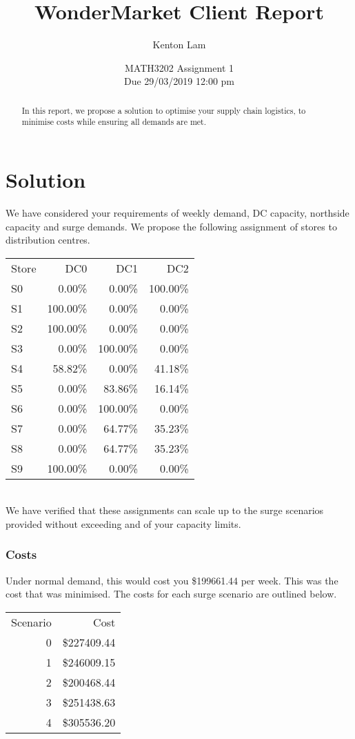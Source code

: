 \documentclass[11pt,a4paper]{article}
\author{Kenton Lam}
\date{{MATH3202 Assignment 1 \\ Due 29/03/2019 12:00 pm}}
\title{WonderMarket Client Report}
\begin{document}
\maketitle
\begin{abstract}
    In this report, we propose a solution to optimise your supply chain logistics, 
    to minimise costs while ensuring all demands are met.
\end{abstract}

\part{Solution}
We have considered your requirements of weekly demand, DC capacity, northside capacity and surge demands.
We propose
the following assignment of stores to distribution centres.\\[0.8em]
\begin{tabular}{l  r  r  r }
    Store & DC0 & DC1 & DC2 \\ 
S0 & 0.00\% & 0.00\% & 100.00\% \\
S1 & 100.00\% & 0.00\% & 0.00\% \\
S2 & 100.00\% & 0.00\% & 0.00\% \\
S3 & 0.00\% & 100.00\% & 0.00\% \\
S4 & 58.82\% & 0.00\% & 41.18\% \\
S5 & 0.00\% & 83.86\% & 16.14\% \\
S6 & 0.00\% & 100.00\% & 0.00\% \\
S7 & 0.00\% & 64.77\% & 35.23\% \\
S8 & 0.00\% & 64.77\% & 35.23\% \\
S9 & 100.00\% & 0.00\% & 0.00\% \\ 
\end{tabular}\\[0.8em]
We have verified that these assignments can scale up to the surge scenarios provided
without exceeding and of your capacity limits.

\section{Costs}
Under normal demand, this would cost you \$199661.44 per week. This was the cost 
that was minimised.
The costs for each surge scenario are outlined below.\\[0.8em]
\begin{tabular}{r  r }
Scenario & Cost  \\ 
0 & \$227409.44 \\ 
1& \$246009.15\\
2 &\$200468.44 \\ 
3 &\$251438.63\\
4 &\$305536.20 \\
\end{tabular}\\[0.8em]
\end{document}
